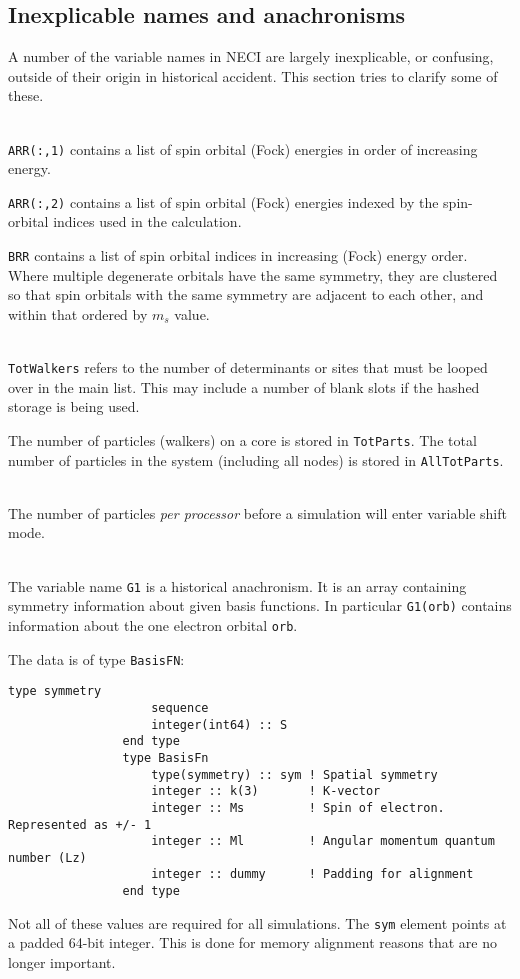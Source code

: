 \documentclass[a4paper,notitlepage]{scrreprt}
\newcommand\headitem[1]{\needspace{1.5\baselineskip}\item[{\boldmath #1 \nopagebreak}] \hfill \\ \nopagebreak}
\let\code\lstinline
\begin{document}
\subsection{Inexplicable names and anachronisms}
	A number of the variable names in NECI are largely inexplicable, or
	confusing, outside of their origin in historical accident. This section
	tries to clarify some of these.

	\begin{description}
		\headitem{ARR, BRR}
			\code{ARR(:,1)} contains a list of spin orbital (Fock)
			energies in	order of increasing energy.

			\code{ARR(:,2)} contains a list of spin orbital (Fock)
			energies indexed by the spin-orbital indices used in the
			calculation.

			\code{BRR} contains a list of spin orbital indices in
			increasing (Fock) energy order. Where multiple degenerate orbitals
			have the same symmetry, they are clustered so that spin orbitals
			with the same symmetry are adjacent to each other, and within that
			ordered by $m_s$ value.

		\headitem{TotWalkers and TotParts}
			\code{TotWalkers} refers to the number of determinants or
			sites that must be looped over in the main list. This may include
			a number of blank slots if the hashed storage is being used.

			The number of particles (walkers) on a core is stored in
			\code{TotParts}. The total number of particles in the system
			(including all nodes) is stored in \code{AllTotParts}.

		\headitem{InitWalkers}
			The number of particles \emph{per processor} before a simulation
			will enter variable shift mode.

		\headitem{G1}
			The variable name \code{G1} is a historical anachronism. It
			is an array containing symmetry information about given basis
			functions. In particular \code{G1(orb)} contains information
			about the one electron orbital \code{orb}.

			The data is of type \code{BasisFN}:
			\begin{lstlisting}[gobble=12]
				type symmetry
					sequence
					integer(int64) :: S
				end type
				type BasisFn
					type(symmetry) :: sym ! Spatial symmetry
					integer :: k(3)       ! K-vector
					integer :: Ms         ! Spin of electron. Represented as +/- 1
					integer :: Ml         ! Angular momentum quantum number (Lz)
					integer :: dummy      ! Padding for alignment
				end type
			\end{lstlisting}
			Not all of these values are required for all simulations. The
			\code{sym} element points at a padded 64-bit integer. This
			is done for memory alignment reasons that are no longer important.
	\end{description}
\end{document}
